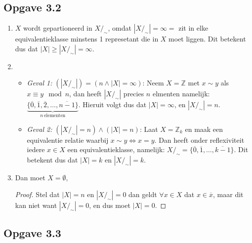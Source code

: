 \documentclass{article}
\newcommand{\Z}{\mathbb{Z}}
\newcommand{\q}{/_\sim}
\newcommand{\ol}[1]{\overline{#1}}
\begin{document}
\subsection*{Opgave 3.2}
\begin{enumerate}[label=\alph*)]
	\item $X$ wordt gepartioneerd in $X/_\sim$, omdat $|X/_\sim| = \infty =$ zit in elke equivalentieklasse minstens 1 represetant die in $X$ moet liggen. Dit betekent dus dat $|X| \geq |X/_\sim| = \infty$.
	\item
	      \begin{itemize}
		      \item \emph{Geval 1:} $(|X/_\sim|) = (n \wedge |X| = \infty)$:
		            Neem $X=\Z$ met $x \sim y$ als $x \equiv y \mod n$, dan
		            heeft $|X\q|$ precies $n$ elmenten namelijk: $\underbrace{\{ \ol{0}, \ol{1}, \ol{2}, \dots ,\ol{n-1} \}}_{n\ \text{elementen}}$.
		            Hieruit volgt dus dat $|X| = \infty$, en $|X\q| = n$.
		      \item \emph{Geval 2:} $(|X\q|  = n) \wedge (|X| = n)$:
		            Laat $X = \Z_{k}$ en maak een equivalentie relatie waarbij $x \sim y \Longleftrightarrow x = y$.
		            Dan heeft onder reflexiviteit iedere $x \in X$ een equivalentieklasse,
		            namelijk: $X\q = \{\ol{0}, \ol{1}, \dots , \ol{k-1} \}$.
		            Dit betekent dus dat $|X| = k$ en $|X\q| = k$.
	      \end{itemize}
	\item
	      Dan moet $X = \emptyset$,
	      \begin{proof}
		      Stel dat $|X| = n$ en $|X\q| = 0$ dan geldt $\forall x \in
			      X$ dat $x \in \ol{x}$,
		      maar dit kan niet want $|X\q| = 0$, en dus
		      moet $|X| = 0$.
	      \end{proof}
\end{enumerate}
\subsection*{Opgave 3.3}
\end{document}
